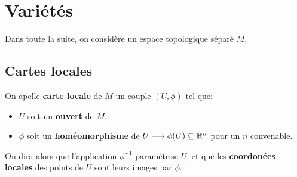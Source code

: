 \chapter{Variétés}
   Dans toute la suite, on considère un espace topologique séparé \( M \).
   \section{Cartes locales}
      On apelle \textbf{carte locale} de \( M \) un couple \( (U, \phi) \) tel que:
      \begin{itemize}
         \item \( U \) soit un \textbf{ouvert} de \( M \).
         \item \( \phi \) soit un \textbf{homéomorphisme} de \( U \longrightarrow \phi(U) \subseteq \mathbb{R}^n \) pour un \( n \) convenable.
      \end{itemize}
      On dira alors que l'application \( \phi^{-1} \) paramétrise \( U \), et que les \textbf{coordonées locales} des points de \( U \) sont leurs images par \( \phi \).
